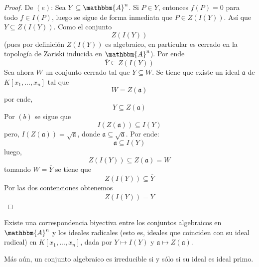 \documentclass[12pt]{report}
\theoremstyle{largebreak}
\newcommand{\bbm}[1]{\ensuremath{\mathbbm{#1}}}
\newcommand{\fk}[1]{\ensuremath{\mathfrak{#1}}}
\begin{document}
\begin{proof}
        De $(e)$: Sea $Y\subseteq\bbm{A}^n$. Si $P\in Y$, entonces $f(P)=0$ para todo $f\in I(P)$, luego se sigue de forma inmediata que $P\in Z(I(Y))$. Así que $Y\subseteq Z(I(Y))$. Como el conjunto
        \begin{equation*}
            Z(I(Y))
        \end{equation*}
        (pues por definición $Z(I(Y))$ es algebraico, en particular es cerrado en la topología de Zariski inducida en $\bbm{A}^n$). Por ende
        \begin{equation*}
            \overline{Y}\subseteq Z(I(Y))
        \end{equation*}
        Sea ahora $W$ un conjunto cerrado tal que $Y\subseteq W$. Se tiene que existe un ideal $\fk{a}$ de $K[x_1,...,x_n]$ tal que
        \begin{equation*}
            W=Z(\fk{a})
        \end{equation*}
        por ende,
        \begin{equation*}
            Y\subseteq Z(\fk{a})
        \end{equation*}
        Por $(b)$ se sigue que
        \begin{equation*}
            I(Z(\fk{a}))\subseteq I(Y)
        \end{equation*}
        pero, $I(Z(\fk{a}))=\sqrt{\fk{a}}$, donde $\fk{a}\subseteq\sqrt{\fk{a}}$. Por ende:
        \begin{equation*}
            \fk{a}\subseteq I(Y)
        \end{equation*}
        luego,
        \begin{equation*}
            Z(I(Y))\subseteq Z(\fk{a})=W
        \end{equation*}
        tomando $W=\overline{Y}$ se tiene que
        \begin{equation*}
            Z(I(Y))\subseteq\overline{Y}
        \end{equation*}
        Por las dos contenciones obtenemos
        \begin{equation*}
            Z(I(Y))=\overline{Y}
        \end{equation*}
    \end{proof}

    \begin{cor}
        Existe una correspondencia biyectiva entre los conjuntos algebraicos en $\bbm{A}^n$ y los ideales radicales (esto es, ideales que coinciden con su ideal radical) en $K[x_1,...,x_n]$, dada por $Y\mapsto I(Y)$ y $\fk{a}\mapsto Z(\fk{a})$.

        Más aún, un conjunto algebraico es irreducible si y sólo si su ideal es ideal primo.
    \end{cor}
\end{document}
